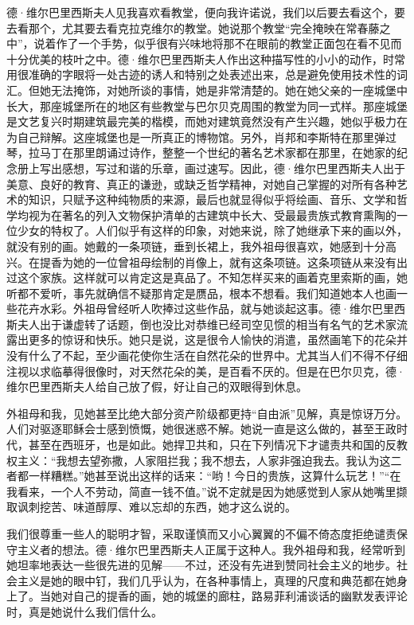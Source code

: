 \par 德·维尔巴里西斯夫人见我喜欢看教堂，便向我许诺说，我们以后要去看这个，要去看那个，尤其要去看克拉克维尔的教堂。她说那个教堂“完全掩映在常春藤之中”，说着作了一个手势，似乎很有兴味地将那不在眼前的教堂正面包在看不见而十分优美的枝叶之中。德·维尔巴里西斯夫人作出这种描写性的小小的动作，时常用很准确的字眼将一处古迹的诱人和特别之处表述出来，总是避免使用技术性的词汇。但她无法掩饰，对她所谈的事情，她是非常清楚的。她在她父亲的一座城堡中长大，那座城堡所在的地区有些教堂与巴尔贝克周围的教堂为同一式样。那座城堡是文艺复兴时期建筑最完美的楷模，而她对建筑竟然没有产生兴趣，她似乎极力在为自己辩解。这座城堡也是一所真正的博物馆。另外，肖邦和李斯特在那里弹过琴，拉马丁在那里朗诵过诗作，整整一个世纪的著名艺术家都在那里，在她家的纪念册上写出感想，写过和谐的乐章，画过速写。因此，德·维尔巴里西斯夫人出于美意、良好的教育、真正的谦逊，或缺乏哲学精神，对她自己掌握的对所有各种艺术的知识，只赋予这种纯物质的来源，最后也就显得似乎将绘画、音乐、文学和哲学均视为在著名的列入文物保护清单的古建筑中长大、受最最贵族式教育熏陶的一位少女的特权了。人们似乎有这样的印象，对她来说，除了她继承下来的画以外，就没有别的画。她戴的一条项链，垂到长裙上，我外祖母很喜欢，她感到十分高兴。在提香为她的一位曾祖母绘制的肖像上，就有这条项链。这条项链从来没有出过这个家族。这样就可以肯定这是真品了。不知怎样买来的画着克里索斯的画，她听都不爱听，事先就确信不疑那肯定是赝品，根本不想看。我们知道她本人也画一些花卉水彩。外祖母曾经听人吹捧过这些作品，就与她谈起这事。德·维尔巴里西斯夫人出于谦虚转了话题，倒也没比对恭维已经司空见惯的相当有名气的艺术家流露出更多的惊讶和快乐。她只是说，这是很令人愉快的消遣，虽然画笔下的花朵并没有什么了不起，至少画花使你生活在自然花朵的世界中。尤其当人们不得不仔细注视以求临摹得很像时，对天然花朵的美，是百看不厌的。但是在巴尔贝克，德·维尔巴里西斯夫人给自己放了假，好让自己的双眼得到休息。
\par 外祖母和我，见她甚至比绝大部分资产阶级都更持“自由派”见解，真是惊讶万分。人们对驱逐耶稣会士感到愤慨，她很迷惑不解。她说一直是这么做的，甚至王政时代，甚至在西班牙，也是如此。她捍卫共和，只在下列情况下才谴责共和国的反教权主义：“我想去望弥撒，人家阻拦我；我不想去，人家非强迫我去。我认为这二者都一样糟糕。”她甚至说出这样的话来：“哟！今日的贵族，这算什么玩艺！”“在我看来，一个人不劳动，简直一钱不值。”说不定就是因为她感觉到人家从她嘴里撷取讽刺挖苦、味道醇厚、难以忘却的东西，她才这么说的。
\par 我们很尊重一些人的聪明才智，采取谨慎而又小心翼翼的不偏不倚态度拒绝谴责保守主义者的想法。德·维尔巴里西斯夫人正属于这种人。我外祖母和我，经常听到她坦率地表达一些很先进的见解——不过，还没有先进到赞同社会主义的地步。社会主义是她的眼中钉，我们几乎认为，在各种事情上，真理的尺度和典范都在她身上了。当她对自己的提香的画，她的城堡的廊柱，路易菲利浦谈话的幽默发表评论时，真是她说什么我们信什么。
